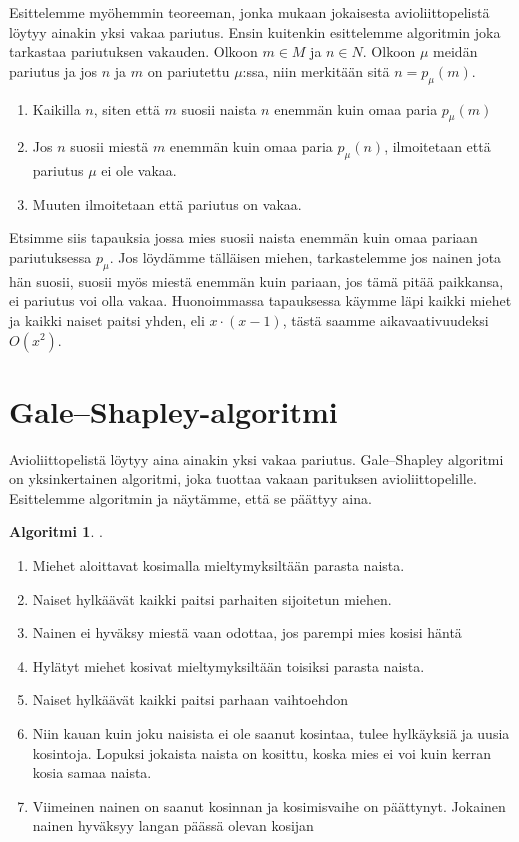 \documentclass[finnish]{tktltiki2}
\theoremstyle{definition}
\newtheorem{alg}[lau]{Algoritmi}
\theoremstyle{remark}
\begin{document}
Esittelemme myöhemmin teoreeman, jonka mukaan jokaisesta avioliittopelistä löytyy ainakin yksi vakaa pariutus. Ensin kuitenkin esittelemme algoritmin joka tarkastaa pariutuksen vakauden.
Olkoon $m \in M$ ja $n \in N$. Olkoon $\mu$ meidän pariutus ja jos $n$ ja $m$ on pariutettu $\mu$:ssa, niin merkitään sitä $n = p_\mu(m)$.
\begin{enumerate}
	\item Kaikilla $n$, siten että $m$ suosii naista $n$ enemmän kuin omaa paria $p_{\mu}(m)$
	\item Jos $n$ suosii miestä $m$ enemmän kuin omaa paria $p_{\mu}(n)$, ilmoitetaan että pariutus $\mu$ ei ole vakaa.
	\item Muuten ilmoitetaan että pariutus on vakaa.
\end{enumerate}

Etsimme siis tapauksia jossa mies suosii naista enemmän kuin omaa pariaan pariutuksessa $p_\mu$.
Jos löydämme tälläisen miehen, tarkastelemme jos nainen jota hän suosii, suosii myös miestä enemmän kuin pariaan, jos tämä pitää paikkansa, ei pariutus voi olla vakaa.
Huonoimmassa tapauksessa käymme läpi kaikki miehet ja kaikki naiset paitsi yhden, eli $x\cdot(x-1)$, tästä saamme aikavaativuudeksi $O(x^2)$.

\section{Gale--Shapley-algoritmi}
Avioliittopelistä löytyy aina ainakin yksi vakaa pariutus. Gale--Shapley algoritmi on yksinkertainen algoritmi, joka tuottaa vakaan parituksen avioliittopelille. Esittelemme algoritmin ja näytämme, että se päättyy aina.
\begin{alg} \cite[p. 13]{gale62a}.
\begin{enumerate}
	\item Miehet aloittavat kosimalla mieltymyksiltään parasta naista.
	\item Naiset hylkäävät kaikki paitsi parhaiten sijoitetun miehen.
	\item Nainen ei hyväksy miestä vaan odottaa, jos parempi mies kosisi häntä
	\item Hylätyt miehet kosivat mieltymyksiltään toisiksi parasta naista.
	\item Naiset hylkäävät kaikki paitsi parhaan vaihtoehdon
	\item Niin kauan kuin joku naisista ei ole saanut kosintaa, tulee hylkäyksiä ja uusia kosintoja. Lopuksi jokaista naista on kosittu, koska mies ei voi kuin kerran kosia samaa naista.
	\item Viimeinen nainen on saanut kosinnan ja kosimisvaihe on päättynyt. Jokainen nainen hyväksyy langan päässä olevan kosijan
\end{enumerate}
\end{alg}
\end{document}
